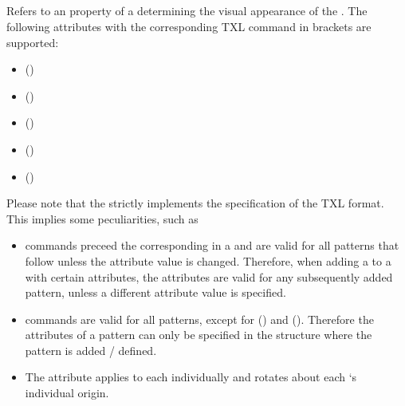 \documentclass[letterpaper,10pt,english]{sphinxmanual}
\begin{document}
\subsection{}
\label{Chapters/10_Introduction:attribute}
Refers to an property of a  determining the visual appearance of the .
The following attributes with the corresponding TXL command in brackets are supported:
\begin{itemize}
\item {} 
 ()

\item {} 
 ()

\item {} 
 ()

\item {} 
 ()

\item {} 
 ()

\end{itemize}

Please note that the  strictly implements the specification of the TXL format.
This implies some peculiarities, such as
\begin{itemize}
\item {} 
 commands preceed the corresponding  in a  and are valid for all patterns that follow
unless the attribute value is changed. Therefore, when adding a  to a  with certain attributes,
the attributes are valid for any subsequently added pattern, unless a different attribute value is specified.

\item {} 
 commands are valid for all patterns, except for  () and  ().
Therefore the attributes of a pattern can only be specified in the structure where the pattern is added / defined.

\item {} 
The  attribute applies to each  individually and rotates about each `s individual origin.

\end{itemize}
\end{document}
